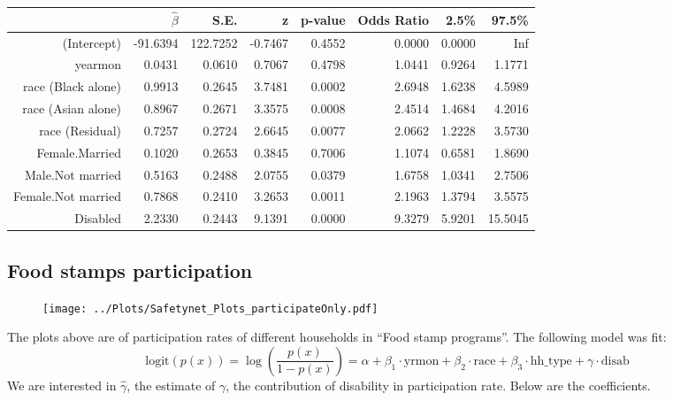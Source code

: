 \documentclass[11pt]{extarticle} %
\begin{document}
\begin{table}[H]
\centering
\begin{tabular}{rrrrrrrr}
  \hline
  & $\hat{\beta}$ & S.E. & z & p-value & Odds Ratio & 2.5\% & 97.5\% \\ 
  \hline
  (Intercept) & -91.6394 & 122.7252 & -0.7467 & 0.4552 & 0.0000 & 0.0000 &   Inf \\ 
  yearmon & 0.0431 & 0.0610 & 0.7067 & 0.4798 & 1.0441 & 0.9264 & 1.1771 \\ 
  race (Black alone) & 0.9913 & 0.2645 & 3.7481 & 0.0002 & 2.6948 & 1.6238 & 4.5989 \\ 
  race (Asian alone) & 0.8967 & 0.2671 & 3.3575 & 0.0008 & 2.4514 & 1.4684 & 4.2016 \\ 
  race (Residual) & 0.7257 & 0.2724 & 2.6645 & 0.0077 & 2.0662 & 1.2228 & 3.5730 \\ 
  Female.Married & 0.1020 & 0.2653 & 0.3845 & 0.7006 & 1.1074 & 0.6581 & 1.8690 \\ 
  Male.Not married & 0.5163 & 0.2488 & 2.0755 & 0.0379 & 1.6758 & 1.0341 & 2.7506 \\ 
  Female.Not married & 0.7868 & 0.2410 & 3.2653 & 0.0011 & 2.1963 & 1.3794 & 3.5575 \\ 
  Disabled & 2.2330 & 0.2443 & 9.1391 & 0.0000 & 9.3279 & 5.9201 & 15.5045 \\ 
  \hline
\end{tabular}
\end{table}

\subsection{Food stamps  participation}
\begin{figure}[H]
\begin{center}
\texttt{[image: ../Plots/Safetynet\_Plots\_participateOnly.pdf]}
\end{center}
\end{figure}
The plots above are of participation rates of different households in ``Food stamp programs''. The following model was fit:
\[ \text{logit}(p(x)) = \log\left(\frac{p(x)}{1 - p(x)}\right) = \alpha + \beta_1\cdot \text{yrmon} + \beta_2 \cdot \text{race} + \beta_3 \cdot \text{hh\_type} + \gamma \cdot \text{disab} \]
We are interested in $\hat{\gamma}$, the estimate of $\gamma$, the contribution of disability in participation rate. Below are the coefficients.
\end{document}
